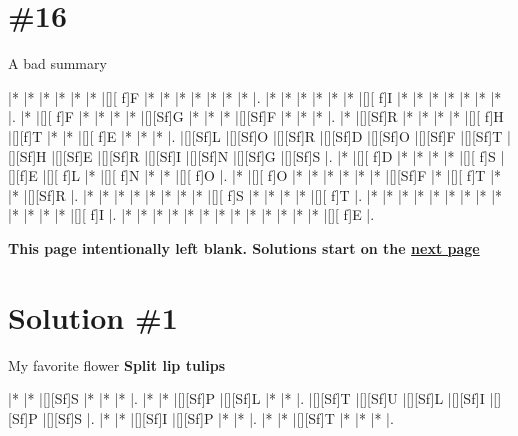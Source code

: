\documentclass[letterpaper]{article}
\begin{document}
\section*{\#16}
A bad summary

\vspace*{1em}
\begin{Puzzle}{14}{10}
|*        |*        |*        |*        |*        |*        |[][ f]F  |*        |*        |*        |*        |*        |*        |*        |.
|*        |*        |*        |*        |*        |*        |[][ f]I  |*        |*        |*        |*        |*        |*        |*        |.
|*        |[][ f]F  |*        |*        |*        |*        |[][Sf]G  |*        |*        |*        |[][Sf]F  |*        |*        |*        |.
|*        |[][Sf]R  |*        |*        |*        |*        |[][ f]H  |[][f]T   |*        |*        |[][ f]E  |*        |*        |*        |.
|[][Sf]L  |[][Sf]O  |[][Sf]R  |[][Sf]D  |[][Sf]O  |[][Sf]F  |[][Sf]T  |[][Sf]H  |[][Sf]E  |[][Sf]R  |[][Sf]I  |[][Sf]N  |[][Sf]G  |[][Sf]S  |.
|*        |[][ f]D  |*        |*        |*        |*        |[][ f]S  |[][f]E   |[][ f]L  |*        |[][ f]N  |*        |*        |[][ f]O  |.
|*        |[][ f]O  |*        |*        |*        |*        |*        |*        |[][Sf]F  |*        |[][ f]T  |*        |*        |[][Sf]R  |.
|*        |*        |*        |*        |*        |*        |*        |*        |[][ f]S  |*        |*        |*        |*        |[][ f]T  |.
|*        |*        |*        |*        |*        |*        |*        |*        |*        |*        |*        |*        |*        |[][ f]I  |.
|*        |*        |*        |*        |*        |*        |*        |*        |*        |*        |*        |*        |*        |[][ f]E  |.
\end{Puzzle}

\newpage
\begin{center}
\textbf{This page intentionally left blank. Solutions start on the \hyperlink{solstart}{next page}}
\end{center}

\newpage

\hypertarget{solstart}{}
\section*{Solution \#1}
My favorite flower
\newline\textbf{Split lip tulips}

\vspace*{1em}
\begin{Puzzle}{6}{5}
|*        |*        |[][Sf]S  |*        |*        |*        |.
|*        |*        |[][Sf]P  |[][Sf]L  |*        |*        |.  
|[][Sf]T  |[][Sf]U  |[][Sf]L  |[][Sf]I  |[][Sf]P  |[][Sf]S  |.
|*        |*        |[][Sf]I  |[][Sf]P  |*        |*        |.
|*        |*        |[][Sf]T  |*        |*        |*        |.
\end{Puzzle}
\end{document}
